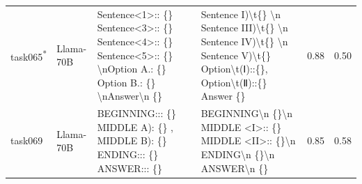 \begin{longtable}{@{}p{0.8cm\tiny}p{1cm\tiny}p{4.1cm\ttfamily\tiny}p{4.1cm\ttfamily\tiny}p{0.8cm\tiny}p{0.8cm\tiny}@{}}
task065\textsuperscript{*}   & Llama-70B  & Sentence\textless{}1\textgreater{}:: \{\}  Sentence\textless{}3\textgreater{}:: \{\}  Sentence\textless{}4\textgreater{}:: \{\}  Sentence\textless{}5\textgreater{}:: \{\} \textbackslash{}nOption A.: \{\}  Option B.: \{\} \textbackslash{}nAnswer\textbackslash{}n \{\}                                                                                                                                                                                                                                              & Sentence I)\textbackslash{}t\{\} \textbackslash{}n Sentence III)\textbackslash{}t\{\} \textbackslash{}n Sentence IV)\textbackslash{}t\{\} \textbackslash{}n Sentence V)\textbackslash{}t\{\}  Option\textbackslash{}t(Ⅰ)::\{\}, Option\textbackslash{}t(Ⅱ)::\{\}  Answer \{\}                                                                                                                                                                                                                                                                                                     & 0.88 & 0.50 \\
task069   & Llama-70B  & BEGINNING::: \{\} MIDDLE A): \{\} ,  MIDDLE B): \{\} ENDING::: \{\} ANSWER::: \{\}                                                                                                                                                                                                                                                                                                                                                                                                                                      & BEGINNING\textbackslash{}n    \{\}\textbackslash{}n MIDDLE  \textless{}I\textgreater{}:: \{\}  MIDDLE  \textless{}II\textgreater{}:: \{\}\textbackslash{}n ENDING\textbackslash{}n    \{\}\textbackslash{}n ANSWER\textbackslash{}n    \{\}                                                                                                                                                                                                                                                                                                                                       & 0.85 & 0.58 \\

\end{longtable}
